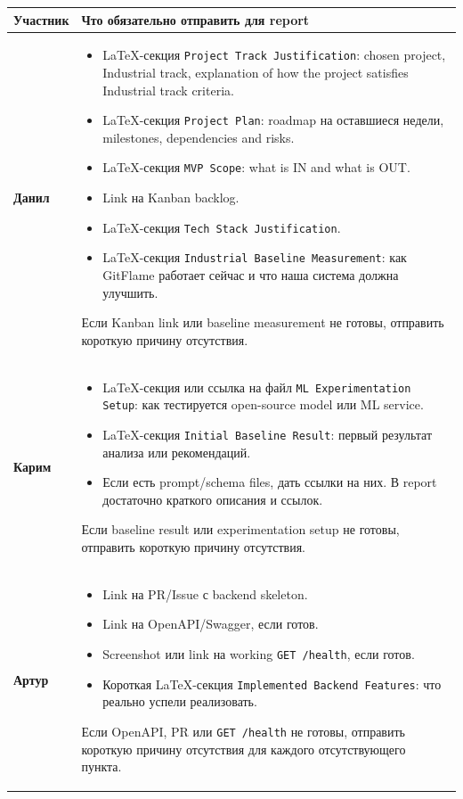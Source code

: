 \documentclass[12pt,a4paper]{article}
\begin{document}
\begin{longtable}{|p{}|p{}|}
\hline
\textbf{Участник} & \textbf{Что обязательно отправить для report} \\
\hline

\textbf{Данил} &
\begin{itemize}
    \item LaTeX-секция \texttt{Project Track Justification}: chosen project, Industrial track, explanation of how the project satisfies Industrial track criteria.
    \item LaTeX-секция \texttt{Project Plan}: roadmap на оставшиеся недели, milestones, dependencies and risks.
    \item LaTeX-секция \texttt{MVP Scope}: what is IN and what is OUT.
    \item Link на Kanban backlog.
    \item LaTeX-секция \texttt{Tech Stack Justification}.
    \item LaTeX-секция \texttt{Industrial Baseline Measurement}: как GitFlame работает сейчас и что наша система должна улучшить.
\end{itemize}
Если Kanban link или baseline measurement не готовы, отправить короткую причину отсутствия. \\
\hline

\textbf{Карим} &
\begin{itemize}
    \item LaTeX-секция или ссылка на файл \texttt{ML Experimentation Setup}: как тестируется open-source model или ML service.
    \item LaTeX-секция \texttt{Initial Baseline Result}: первый результат анализа или рекомендаций.
    \item Если есть prompt/schema files, дать ссылки на них. В report достаточно краткого описания и ссылок.
\end{itemize}
Если baseline result или experimentation setup не готовы, отправить короткую причину отсутствия. \\
\hline

\textbf{Артур} &
\begin{itemize}
    \item Link на PR/Issue с backend skeleton.
    \item Link на OpenAPI/Swagger, если готов.
    \item Screenshot или link на working \texttt{GET /health}, если готов.
    \item Короткая LaTeX-секция \texttt{Implemented Backend Features}: что реально успели реализовать.
\end{itemize}
Если OpenAPI, PR или \texttt{GET /health} не готовы, отправить короткую причину отсутствия для каждого отсутствующего пункта. \\
\hline


\end{longtable}
\end{document}
